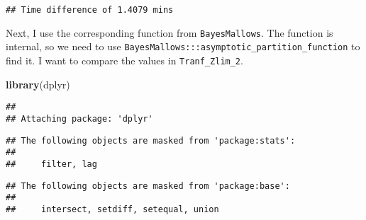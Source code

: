 \documentclass[]{article}
\newenvironment{Shaded}{\begin{snugshade}}{\end{snugshade}}
\newcommand{\DataTypeTok}[1]{\textcolor[rgb]{0.13,0.29,0.53}{#1}}
\newcommand{\KeywordTok}[1]{\textcolor[rgb]{0.13,0.29,0.53}{\textbf{#1}}}
\newcommand{\NormalTok}[1]{#1}
\newcommand{\OperatorTok}[1]{\textcolor[rgb]{0.81,0.36,0.00}{\textbf{#1}}}
\newcommand{\OtherTok}[1]{\textcolor[rgb]{0.56,0.35,0.01}{#1}}
\newcommand{\StringTok}[1]{\textcolor[rgb]{0.31,0.60,0.02}{#1}}
\begin{document}
\begin{verbatim}
## Time difference of 1.4079 mins
\end{verbatim}

Next, I use the corresponding function from \texttt{BayesMallows}. The
function is internal, so we need to use
\texttt{BayesMallows:::asymptotic\_partition\_function} to find it. I
want to compare the values in \texttt{Tranf\_Zlim\_2}.

\begin{Shaded}
\begin{Highlighting}[]
\KeywordTok{library}\NormalTok{(dplyr)}
\end{Highlighting}
\end{Shaded}

\begin{verbatim}
## 
## Attaching package: 'dplyr'
\end{verbatim}

\begin{verbatim}
## The following objects are masked from 'package:stats':
## 
##     filter, lag
\end{verbatim}

\begin{verbatim}
## The following objects are masked from 'package:base':
## 
##     intersect, setdiff, setequal, union
\end{verbatim}

\begin{Shaded}
\end{Shaded}
\end{document}
